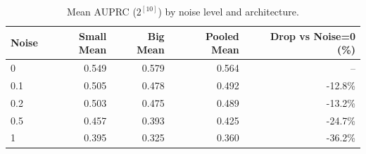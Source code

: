 \begin{table}[ht]
\centering
\caption{Mean AUPRC ($2^{[10]}$) by noise level and architecture.}
\label{tab:auprc_by_noise}
\begin{tabular}{lrrrr}
\toprule
Noise & Small Mean & Big Mean & Pooled Mean & Drop vs Noise=0 (\%) \\
\midrule
0 & 0.549 & 0.579 & 0.564 & -- \\
0.1 & 0.505 & 0.478 & 0.492 & -12.8\% \\
0.2 & 0.503 & 0.475 & 0.489 & -13.2\% \\
0.5 & 0.457 & 0.393 & 0.425 & -24.7\% \\
1 & 0.395 & 0.325 & 0.360 & -36.2\% \\
\bottomrule
\end{tabular}
\end{table}